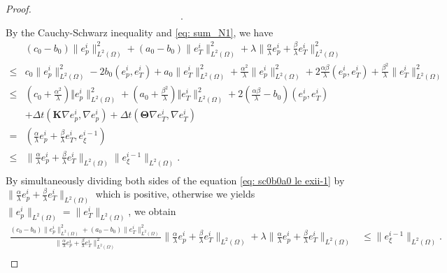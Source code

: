 \documentclass{article}
\numberwithin{equation}{section}
\begin{document}
\begin{proof}
\begin{equation}
\begin{aligned}
         .\\
\end{aligned}
\end{equation}
By the Cauchy-Schwarz inequality and \eqref{eq: sum_N1}, we have 
\begin{equation}\label{eq: sc0b0a0 le exii-1}  
\begin{aligned}
& (c_0-b_0)\|e_{p}^i\|_{L^2(\Omega)}^2+(a_0-b_0)\|e_{T}^i\|_{L^2(\Omega)}^2
  +\lambda\|\frac\alpha\lambda e_{p}^i+\frac\beta\lambda e_{T}^i \|_{L^2(\Omega)}^2\\
\le&    c_0 \|e_{p}^i\|_{L^2(\Omega)}^2-2b_0(e_{p}^i,e_{T}^i)+ a_0\|e_{T}^i\|_{L^2(\Omega)}^2         
 +\frac{\alpha^2}{\lambda}\|e_{p}^i\|_{L^2(\Omega)}^2+2\frac{\alpha\beta}{\lambda}(e_{p}^i,e_{T}^i)
+\frac{\beta^2}{\lambda}\|e_{T}^i\|_{L^2(\Omega)}^2                              \\
   \le & (c_0 + \frac{\alpha^2}{\lambda})\Vert e_{p}^i\|_{L^2(\Omega)}^2 
     + (a_0 + \frac{\beta^2}{\lambda})\Vert e_{T}^i\|_{L^2(\Omega)}^2 
     + 2(\frac{\alpha\beta}{\lambda}-b_0)(e_{p}^i,e_{T}^i)\\
     &+ \Delta t(\bm K\nabla e_{p}^i,\nabla  e_{p}^i) 
     + \Delta t(\bm\Theta\nabla e_{T}^i,\nabla e_{T}^i )  
          \\
   =&      ( \frac\alpha\lambda e_{p}^i+\frac\beta\lambda e_{T}^i,e_{\xi}^{i-1})\\
   \le&   \|\frac\alpha\lambda e_{p}^i+\frac\beta\lambda e_{T}^i \|_{L^2(\Omega)}  \|e_{\xi}^{i-1}\|_{L^2(\Omega)}.
   \\
\end{aligned}
\end{equation} 
By simultaneously dividing both sides of the equation \eqref{eq: sc0b0a0 le exii-1} by $\|\frac\alpha\lambda e_{p}^i+\frac\beta\lambda e_{T}^i \|_{L^2(\Omega)}$ which is positive, otherwise we yields \(  \|e_{p}^i \|_{L^2(\Omega)}=\|e_{T}^i \|_{L^2(\Omega)}\), we obtain 
\begin{equation*} %
\begin{aligned}
   \frac{(c_0-b_0)\|e_{p}^i\|_{L^2(\Omega)}^2+(a_0-b_0)\|e_{T}^i\|_{L^2(\Omega)}^2}{ \|\frac\alpha\lambda e_{p}^i+\frac\beta\lambda e_{T}^i \|_{L^2(\Omega)}^2 }\|\frac\alpha\lambda e_{p}^i+\frac\beta\lambda e_{T}^i \|_{L^2(\Omega)}+\lambda\|\frac\alpha\lambda e_{p}^i+\frac\beta\lambda e_{T}^i \|_{L^2(\Omega)}  
& \le     \|e_{\xi}^{i-1}\|_{L^2(\Omega)}. \\
\end{aligned}
\end{equation*}  

\end{proof}
\end{document}

